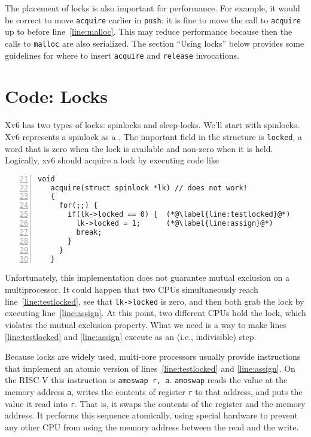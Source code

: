 The placement of locks is also important for performance.
For example, it would be correct to move
\lstinline{acquire}
earlier in
\lstinline{push}:
it is fine to move the call to
\lstinline{acquire}
up to before line~\ref{line:malloc}.
This may reduce performance because then the calls
to
\lstinline{malloc}
are also serialized.
The section ``Using locks'' below provides some guidelines for where to insert
\lstinline{acquire}
and
\lstinline{release}
invocations.
\section{Code: Locks}
Xv6 has two types of locks: spinlocks and sleep-locks.
We'll start with spinlocks.
Xv6 represents a spinlock as a
.
The important field in the structure is
\lstinline{locked},
a word that is zero when the lock is available
and non-zero when it is held.
Logically, xv6 should acquire a lock by executing code like
\begin{lstlisting}[numbers=left,firstnumber=21]
   void
   acquire(struct spinlock *lk) // does not work!
   {
     for(;;) {
       if(lk->locked == 0) {  (*@\label{line:testlocked}@*)
         lk->locked = 1;      (*@\label{line:assign}@*)
         break;
       }
     }
   }
\end{lstlisting}
Unfortunately, this implementation does not
guarantee mutual exclusion on a multiprocessor.
It could happen that two CPUs simultaneously
reach line~\ref{line:testlocked}, see that 
\lstinline{lk->locked}
is zero, and then both grab the lock by executing line~\ref{line:assign}.
At this point, two different CPUs hold the lock,
which violates the mutual exclusion property.
What we need is a way to
make lines \ref{line:testlocked} and \ref{line:assign} execute as an
(i.e., indivisible) step.

Because locks are widely used,
multi-core processors usually provide instructions that
implement an atomic version of
lines~\ref{line:testlocked} and \ref{line:assign}.
On the RISC-V this instruction is
\lstinline{amoswap r, a}.
\lstinline{amoswap}
reads the value at the memory address {\tt a},
writes the contents of register {\tt r} to that address,
and puts the value it read into {\tt r}.
That is, it swaps the contents of the register and the memory address.
It performs this sequence atomically, using special
hardware to prevent any
other CPU from using the memory address between the read and the write.

